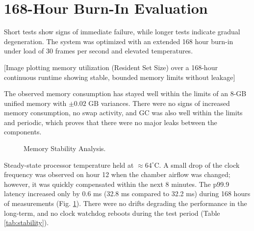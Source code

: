 \documentclass[conference]{IEEEtran}
\begin{document}
\section{168-Hour Burn-In Evaluation}

Short tests show signs of immediate failure, while longer tests indicate gradual degeneration. The system was optimized with an extended 168 hour burn-in under load of 30 frames per second and elevated temperatures.

[Image plotting memory utilization (Resident Set Size) over a 168-hour continuous runtime showing stable, bounded memory limits without leakage]

The observed memory consumption has stayed well within the limits of an 8-GB unified memory with $\pm 0.02\text{ GB}$ variances. There were no signs of increased memory consumption, no swap activity, and GC was also well within the limits and periodic, which proves that there were no major leaks between the components.

\begin{figure}[htbp]
\centering
{}
\caption{Memory Stability Analysis.}
\label{fig:memory}
\end{figure}

Steady-state processor temperature held at $\approx 64^\circ\text{C}$. A small drop of the clock frequency was observed on hour 12 when the chamber airflow was changed; however, it was quickly compensated within the next 8 minutes. The p99.9 latency increased only by 0.6 ms (32.8 ms compared to 32.2 ms) during 168 hours of measurements (Fig. \ref{fig:memory}). There were no drifts degrading the performance in the long-term, and no clock watchdog reboots during the test period (Table \ref{tab:stability}).
\end{document}
